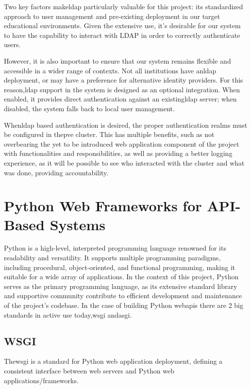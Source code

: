   Two key factors make\ac{ldap} particularly valuable for this project: its standardized approach to user management 
  and pre-existing deployment in our target educational environments. Given the extensive use, it's desirable for our 
  system to have the capability to interact with LDAP in order to correctly authenticate users.

  However, it is also important to ensure that our system remains flexible and accessible in a wider range of contexts. 
  Not all institutions have an\ac{ldap} deployment, or may have a preference for alternative identity providers. 
  For this reason,\ac{ldap} support in the system is designed as an optional integration. When enabled, it provides 
  direct authentication against an existing\ac{ldap} server; when disabled, the system falls back to local user management.

  When\ac{ldap} based authentication is desired, the proper authentication realms must be configured in the\ac{pve} 
  cluster. This has multiple benefits, such as not overbearing the yet to be introduced web application component of 
  the project with functionalities and responsibilities, as well as providing a better logging experience, as it will be 
  possible to see who interacted with the cluster and what was done, providing accountability.

\section{Python Web Frameworks for API-Based Systems}

  Python is a high-level, interpreted programming language renowned for its readability and versatility. It supports 
  multiple programming paradigms, including procedural, object-oriented, and functional programming, making it suitable 
  for a wide array of applications.
  In the context of this project, Python serves as the primary programming language, as its extensive standard library 
  and supportive community contribute to efficient development and maintenance of the project's codebase. 
  In the case of building Python web\ac{api}s there are 2 big standards in active use today,\ac{wsgi} and\ac{asgi}. 

  \subsection{WSGI}
    The\ac{wsgi} is a standard for Python web application deployment, defining a consistent interface between web 
    servers and Python web applications/frameworks.

